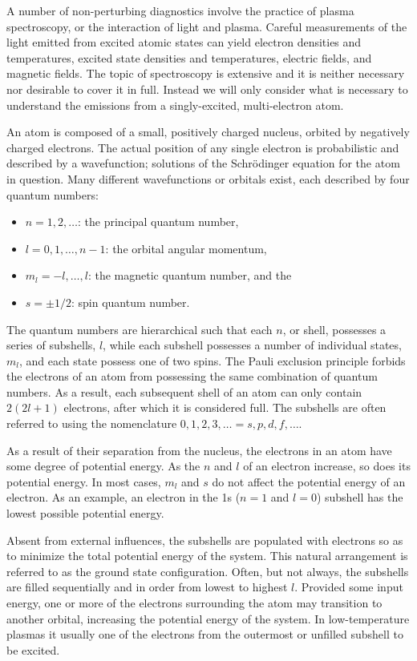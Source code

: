 A number of non-perturbing diagnostics involve the practice of plasma
spectroscopy, or the interaction of light and plasma. Careful measurements of
the light emitted from excited atomic states can yield electron densities and
temperatures, excited state densities and temperatures, electric fields, and
magnetic fields. The topic of spectroscopy is extensive and it is neither
necessary nor desirable to cover it in full. Instead we will only consider what
is necessary to understand the emissions from a singly-excited, multi-electron
atom.

An atom is composed of a small, positively charged nucleus, orbited by
negatively charged electrons. The actual position of any single electron is
probabilistic and described by a wavefunction; solutions of the Schr\"{o}dinger
equation for the atom in question. Many different wavefunctions or orbitals
exist, each described by four quantum numbers:
\begin{itemize}
  \item $n=1,2,\ldots$: the principal quantum number,
  \item $l=0,1,\ldots,n-1$: the orbital angular momentum,
  \item $m_l =-l,\ldots,l$: the magnetic quantum number, and the
  \item $s=\pm1/2$: spin quantum number.
\end{itemize}
The quantum numbers are hierarchical such that each $n$, or shell, possesses a
series of subshells, $l$, while each subshell possesses a number of individual
states, $m_l$, and each state possess one of two spins. The Pauli exclusion
principle forbids the electrons of an atom from possessing the same combination
of quantum numbers. As a result, each subsequent shell of an atom can only
contain $2(2l+1)$ electrons, after which it is considered full. The subshells
are often referred to using the nomenclature $0,1,2,3,\ldots = s,p,d,f,\ldots$.

As a result of their separation from the nucleus, the electrons in an atom have
some degree of potential energy. As the $n$ and $l$ of an electron increase, so
does its potential energy. In most cases, $m_l$ and $s$ do not affect the
potential energy of an electron. As an example, an electron in the 1s ($n=1$ and
$l=0$) subshell has the lowest possible potential energy.

Absent from external influences, the subshells are populated with electrons so
as to minimize the total potential energy of the system. This natural
arrangement is referred to as the ground state configuration. Often, but not
always, the subshells are filled sequentially and in order from lowest to
highest $l$. Provided some input energy, one or more of the electrons
surrounding the atom may transition to another orbital, increasing the potential
energy of the system. In low-temperature plasmas it usually one of the electrons
from the outermost or unfilled subshell to be excited.

